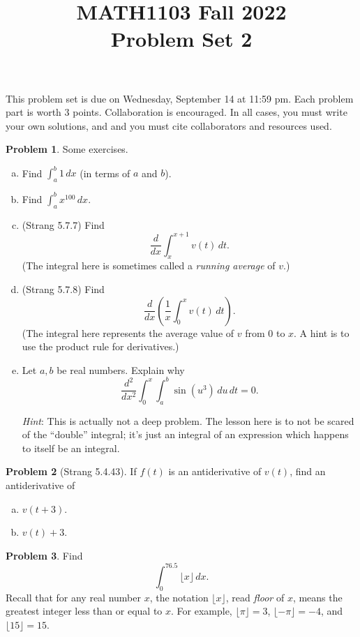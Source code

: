 \documentclass[11pt,oneside]{amsart}
\title{MATH1103 Fall 2022\\
Problem Set 2}
\theoremstyle{definition}
\newtheorem{problem}{Problem}
\begin{document}
    \maketitle
    This problem set is due on Wednesday, September 14 at 11:59 pm. Each problem part is worth 3 points. Collaboration is encouraged. In all cases, you must write your own solutions, and and you must cite collaborators and resources used.

    \begin{problem}
        Some exercises.
        \begin{enumerate}[(a)]
            \item Find $\int_a^b 1\,dx$ (in terms of $a$ and $b$).
            \item Find $\int_a^b x^{100}\,dx$.
            \item (Strang 5.7.7) Find
            \[\frac d{dx}\int_x^{x+1}v(t)\,dt.\]
            (The integral here is sometimes called a \emph{running average} of $v$.)
            \item (Strang 5.7.8) Find
            \[\frac d{dx}\left(\frac 1x\int_0^x v(t)\,dt\right).\]
            (The integral here represents the average value of $v$ from 0 to $x$. A hint is to use the product rule for derivatives.)
            \item Let $a,b$ be real numbers. Explain why
            \[\frac {d^2}{dx^2}\int_0^x\int_a^b \sin(u^3)\,du\,dt=0.\]

            \emph{Hint}: This is actually not a deep problem. The lesson here is to not be scared of the ``double'' integral; it's just an integral of an expression which happens to itself be an integral.
        \end{enumerate}
    \end{problem}

    \begin{problem}[Strang 5.4.43]
        If $f(t)$ is an antiderivative of $v(t)$, find an antiderivative of
        \begin{enumerate}[(a)]
            \item $v(t+3)$.
            \item $v(t)+3$.
        \end{enumerate}
    \end{problem}

    \begin{problem}
        Find
        \[\int_0^{76.5}\lfloor x\rfloor\,dx.\]
        Recall that for any real number $x$, the notation $\lfloor x\rfloor$, read \emph{floor} of $x$, means the greatest integer less than or equal to $x$. For example, $\lfloor \pi\rfloor=3$, $\lfloor -\pi\rfloor=-4$, and $\lfloor 15\rfloor=15$.
    \end{problem}
\end{document}
